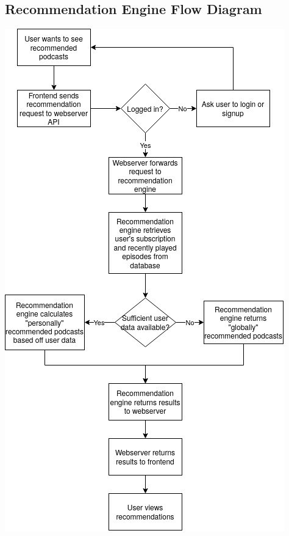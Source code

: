 \documentclass[12pt]{article}
\begin{document}
\newpage



\begin{appendices}
    \section{Recommendation Engine Flow Diagram} \label{app:recommendation_engine_flowchart}
    \begin{center}
        \includegraphics[height=0.5\paperheight]{resources/recommendation_engine}
    \end{center}

\end{appendices}
\end{document}
